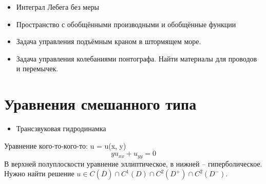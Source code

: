 \documentclass[11pt]{article}
\author{Sergey Makarov}
\date{\today}
\title{}
\begin{document}
\tableofcontents

\begin{itemize}
\item Интеграл Лебега без меры
\item Пространство с обобщёнными производными и обобщённые функции
\item Задача управления подъёмным краном в штормящем море.
\item Задача управления колебаниями понтографа. Найти материалы для проводов и перемычек.
\end{itemize}

\section{Уравнения смешанного типа}
\label{sec:org43a1bdf}
\begin{itemize}
\item Трансзвуковая гидродинамка
\end{itemize}
Уравнение кого-то-кого-то:
u = u(x, y)
\begin{equation}
yu_{xx} + u_{yy} = 0
\end{equation}
В верхней полуплоскости уравнение эллиптическое, в нижней -- гиперболическое. Нужно найти
решение $u \in C(\overline{D}) \cap C^1(D) \cap C^2(D^+) \cap C^2(D^-)$.
\end{document}
